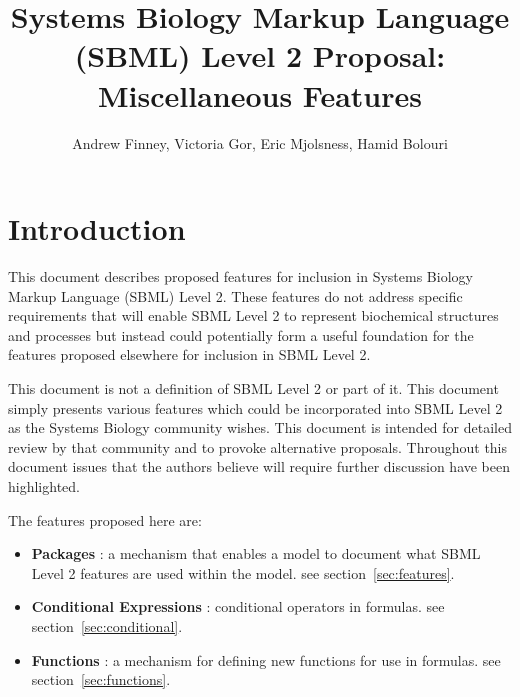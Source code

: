 \documentclass{cekarticle}
\begin{document}

\title{Systems Biology Markup Language (SBML) Level 2 Proposal: Miscellaneous Features}

\author{Andrew Finney, Victoria Gor, Eric Mjolsness, Hamid Bolouri}


\maketitlepage

\section{Introduction}
\label{sec:introduction}

This document describes proposed features for inclusion in
Systems Biology Markup Language (SBML) Level 2. These features do
not address specific requirements that will enable SBML Level 2
to represent biochemical structures and processes but instead
could potentially form a useful foundation for the features
proposed elsewhere for inclusion in SBML Level 2.

This document is not a definition of SBML Level 2 or part of it.
This document simply presents various features which could be
incorporated into SBML Level 2 as the Systems Biology community
wishes.  This document is intended for detailed review by that
community and to provoke alternative proposals.  Throughout this
document issues that the authors believe will require further
discussion have been highlighted.

The features proposed here are:

\begin{itemize}
\item \textbf{Packages} : a mechanism that enables a model to
document what SBML Level 2 features are used within the model.
see section~\ref{sec:features}.
\item \textbf{Conditional Expressions} : conditional operators
in formulas.  see section~\ref{sec:conditional}.
\item \textbf{Functions} : a mechanism for defining new
functions for use in formulas.  see section~\ref{sec:functions}.
\end{itemize}
\end{document}
